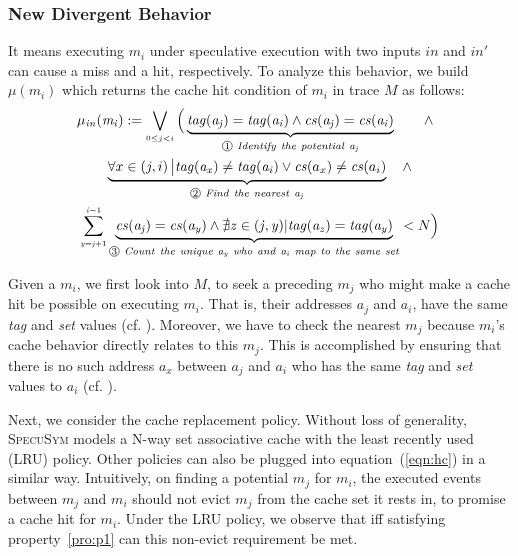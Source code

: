 \documentclass[sigconf, review]{acmart}
\newcommand*\circled[1]{\tikz[baseline=(char.base)]{
				\node[shape=circle,draw,inner sep=.4pt] (char) {\scriptsize{#1}};}}
\newcommand{\SpecuSym}{\textsc{SpecuSym} }
\begin{document}
\subsubsection{New Divergent Behavior}
\label{sec:new_div}
It means executing $\mathit{m_i}$ under speculative execution with two inputs 
$\mathit{in}$ and $\mathit{in'}$ can cause a miss and a hit, respectively. To
analyze this behavior, we build $\mathit{\mu(m_i)}$ which returns the cache hit
condition of $\mathit{m_i}$ in trace $\mathit{M}$ as follows:
%
%
\begin{multline}
  \label{eqn:hc}
    \mathit{\mu_{in}(m_i)}:=
    \bigvee_{{\scriptscriptstyle 0{\leq}j<i}}
    \Big(
    \underbrace{
      \mathit{tag(a_j)}=\mathit{tag(a_i)} 
			\wedge 
      \mathit{cs(a_j)}=\mathit{cs(a_i)} 
    }_{{\circled{1}}\mathit{~Identify~the~potential~a_j}}
    ~~~~~~\wedge 
		~~\\
    \underbrace{
      {\forall}x\in\left(j,i\right)\big |\mathit{tag(a_x)}\ne\mathit{tag(a_i)}
      \vee 
      \mathit{cs}(a_x)\ne\mathit{cs}(a_i)
    }_{{\circled{2}}\mathit{~Find~the~nearest~a_j}}
		~~~\wedge 
		\\
    \sum_{{\scriptscriptstyle \mathit{y=j}+1}}^{{\scriptscriptstyle \mathit{i-}1}} 
    \underbrace{
      \mathit{cs(a_j)}=\mathit{cs(a_y)} 
      \wedge
      \nexists\mathit{z}\in(\mathit{j,y})|\mathit{tag(a_z)}=\mathit{tag(a_y)}
    }_{{\circled{3}}\mathit{~Count~the~unique~a_y~who~and~a_i~map~to~the~same~set}}
    <N 
    \Big)
\end{multline}
\vspace{.8ex}
%
%

Given a $\mathit{m_i}$, we first look into $\mathit{M}$, to seek a preceding 
$\mathit{m_j}$ who might make a cache hit be possible on executing 
$\mathit{m_i}$. That is, their addresses $\mathit{a_j}$ and $\mathit{a_i}$, 
have the same \emph{tag} and \emph{set} values (cf. \circled{1}). Moreover, 
we have to check the nearest $\mathit{m_j}$ because $\mathit{m_i}$'s cache 
behavior directly relates to this $\mathit{m_j}$. This is accomplished by 
ensuring that there is no such address $\mathit{a_x}$ between $\mathit{a_j}$ 
and $\mathit{a_i}$ who has the same \textit{tag} and \textit{set} values to 
$\mathit{a_i}$ (cf. \circled{2}).


Next, we consider the cache replacement policy. Without loss of generality, 
\SpecuSym models a N-way set associative cache with the least recently used 
(LRU) policy. Other policies can also be plugged into equation~(\ref{eqn:hc}) 
in a similar way. Intuitively, on finding a potential $\mathit{m_j}$ for 
$\mathit{m_i}$, the executed events between $\mathit{m_j}$ and $\mathit{m_i}$ 
should not evict $\mathit{m_j}$ from the cache set it rests in, to promise 
a cache hit for $\mathit{m_i}$. Under the LRU policy, we observe that iff 
satisfying property~\ref{pro:p1} can this non-evict requirement be met.
\end{document}
